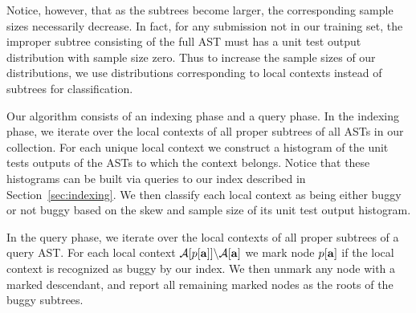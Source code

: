 Notice, however, that as the subtrees become larger, the corresponding sample sizes necessarily decrease.  In fact, for any submission not in our training set, the improper subtree consisting of the full AST must has a unit test output distribution with sample size zero.  Thus to increase the sample sizes of our distributions, we use distributions corresponding to local contexts instead of subtrees for classification.

Our algorithm consists of an indexing phase and a query phase.  In the indexing phase, we iterate over the local contexts of all proper subtrees of all ASTs in our collection.  For each unique local context we construct a histogram of the unit tests outputs of the ASTs to which the context belongs.   Notice that these histograms
can be built via queries to our index described in Section~\ref{sec:indexing}.
We then classify each local context as being either buggy or not buggy based on the skew and sample size of its unit test output histogram.

In the query phase, we iterate over the local contexts of all proper subtrees of a query AST.  For each local context $\mathcal{A}[p[{\bf a}]]\backslash\mathcal{A}[{\bf a}]$ we mark node $p[{\bf a}]$ if the local context is recognized as 
buggy by our index.  We then unmark any node with a marked descendant, and report all remaining marked nodes as the roots of the buggy subtrees.


